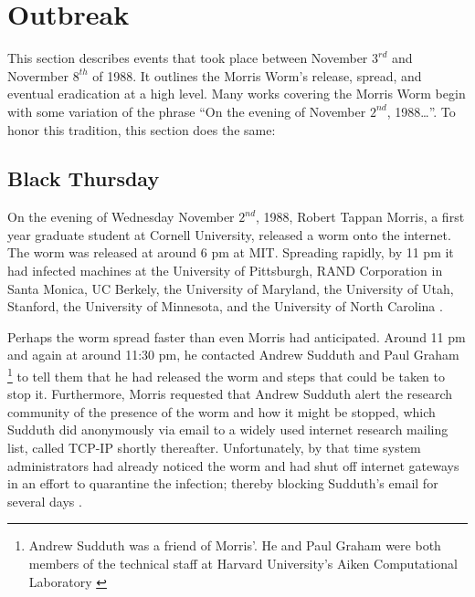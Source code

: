 \section*{Outbreak}
This section describes events that took place between November $3^{rd}$ and
Novermber $8^{th}$ of 1988. It outlines the Morris Worm's release, spread, and
eventual eradication at a high level.
Many works covering the Morris Worm begin with some variation of the phrase
``On the evening of November $2^{nd}$, 1988\ldots''.
 \cite{seeley_tour_1989}
 \cite{spafford_crisis_1989}
 \cite{lee_washpost_2013}
 \cite{spafford_internet_1989-1}
 \cite{spafford_internet_1989}
 \cite{eichin_microscope_1989}
To honor this tradition, this section does the same: 

\subsection*{Black Thursday}

On the evening of Wednesday November $2^{nd}$, 1988, Robert Tappan Morris, a
first year graduate student at Cornell University, released a worm onto the
internet. The worm was released at around 6 pm at MIT. Spreading rapidly, by 11
pm it had infected machines at
the University of Pittsburgh,
RAND Corporation in Santa Monica,
UC Berkely,
the University of Maryland,
the University of Utah,
Stanford,
the University of Minnesota,
and the University of North Carolina
\cite{seeley_tour_1989}
\cite{spafford_internet_1989-1}.

Perhaps the worm spread faster than even Morris had anticipated. Around
11 pm and again at around 11:30 pm, he contacted Andrew Sudduth and Paul Graham
\footnote{
Andrew Sudduth was a friend of Morris'. He and Paul Graham were both
members of the technical staff at Harvard University's Aiken Computational
Laboratory \cite{lee_washpost_2013}
}
to tell them that he had released the worm and steps that could be taken to stop
it. Furthermore, Morris requested that Andrew Sudduth alert the research
community of the presence of the worm and how it might be stopped, which
Sudduth did anonymously via email to a widely used internet research mailing
list, called TCP-IP shortly thereafter.
Unfortunately, by that time system administrators had already noticed the worm and had shut off
internet gateways in an effort to quarantine the infection; thereby blocking
Sudduth's email for several days
\cite{lee_washpost_2013}\cite{eisenberg_cornell_1989}.

